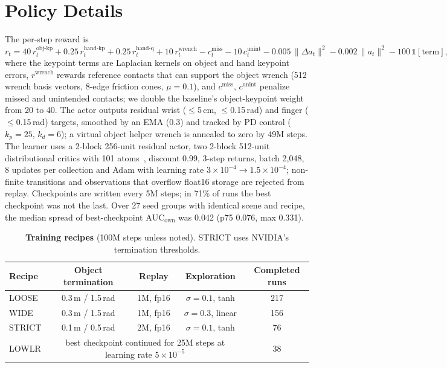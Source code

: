\documentclass[10pt]{nvidiaextabstract}
\newcommand{\ownauc}{\ensuremath{\mathrm{AUC}_{\text{own}}}\xspace}
\begin{document}
\section{Policy Details}
\label{app:policy}
The per-step reward is
\begin{equation}
\label{eq:reward}
r_t = 40\,r^\text{obj-kp}_t + 0.25\,r^\text{hand-kp}_t + 0.25\,r^\text{hand-q}_t + 10\,r^\text{wrench}_t - c^\text{miss}_t - 10\,c^\text{unint}_t - 0.005\,\|\Delta a_t\|^2 - 0.002\,\|a_t\|^2 - 100\,\mathbb{1}[\text{term}],
\end{equation}
where the keypoint terms are Laplacian kernels on object and hand keypoint errors, $r^\text{wrench}$ rewards reference contacts that can support the object wrench (512 wrench basis vectors, 8-edge friction cones, $\mu=0.1$), and $c^\text{miss}$, $c^\text{unint}$ penalize missed and unintended contacts; we double the baseline's object-keypoint weight from 20 to 40. The actor outputs residual wrist ($\le$5\,cm, $\le$0.15\,rad) and finger ($\le$0.15\,rad) targets, smoothed by an EMA (0.3) and tracked by PD control ($k_p=25$, $k_d=6$); a virtual object helper wrench is annealed to zero by 49M steps. The learner uses a 2-block 256-unit residual actor, two 2-block 512-unit distributional critics with 101 atoms~\cite{bellemare2017c51}, discount 0.99, 3-step returns, batch 2{,}048, 8 updates per collection and Adam with learning rate $3\times10^{-4}\!\rightarrow\!1.5\times10^{-4}$; non-finite transitions and observations that overflow float16 storage are rejected from replay. Checkpoints are written every 5M steps; in 71\% of runs the best checkpoint was not the last. Over 27 seed groups with identical scene and recipe, the median spread of best-checkpoint \ownauc was 0.042 (p75 0.076, max 0.331).

\begin{table}[h]
  \centering\small
  \setlength{\tabcolsep}{5pt}
  \begin{tabular}{@{}lcccc@{}}
    \toprule
    \textbf{Recipe} & \textbf{Object termination} & \textbf{Replay} & \textbf{Exploration} & \textbf{Completed runs} \\
    \midrule
    LOOSE  & 0.3\,m / 1.5\,rad & 1M, fp16 & $\sigma=0.1$, tanh & 217 \\
    WIDE   & 0.3\,m / 1.5\,rad & 1M, fp16 & $\sigma=0.3$, linear & 156 \\
    STRICT & 0.1\,m / 0.5\,rad & 2M, fp16 & $\sigma=0.1$, tanh & 76 \\
    LOWLR  & \multicolumn{3}{c}{best checkpoint continued for 25M steps at learning rate $5\times10^{-5}$} & 38 \\
    \bottomrule
  \end{tabular}
  \caption{\textbf{Training recipes} (100M steps unless noted). STRICT uses NVIDIA's termination thresholds.}
  \label{tab:recipes}
\end{table}
\end{document}

